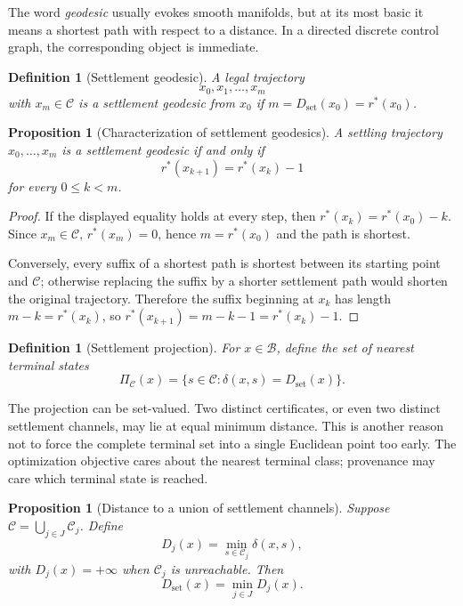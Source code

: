 \documentclass[11pt,letterpaper]{article}
\newtheorem{proposition}[theorem]{Proposition}
\newtheorem{definition}[theorem]{Definition}
\theoremstyle{remark}
\newcommand{\Cset}{\mathcal C}
\newcommand{\Basin}{\mathcal B}
\newcommand{\rstar}{r^{\!*}}
\newcommand{\dset}{D_{\mathrm{set}}}
\begin{document}
The word \emph{geodesic} usually evokes smooth manifolds, but at its most basic it means a shortest path with respect to a distance. In a directed discrete control graph, the corresponding object is immediate.

\begin{definition}[Settlement geodesic]
A legal trajectory
\[
x_0,x_1,\ldots,x_m
\]
with $x_m\in\Cset$ is a settlement geodesic from $x_0$ if $m=\dset(x_0)=\rstar(x_0)$.
\end{definition}

\begin{proposition}[Characterization of settlement geodesics]\label{prop:geodesic}
A settling trajectory $x_0,\ldots,x_m$ is a settlement geodesic if and only if
\[
\rstar(x_{k+1})=\rstar(x_k)-1
\]
for every $0\le k<m$.
\end{proposition}

\begin{proof}
If the displayed equality holds at every step, then $\rstar(x_k)=\rstar(x_0)-k$. Since $x_m\in\Cset$, $\rstar(x_m)=0$, hence $m=\rstar(x_0)$ and the path is shortest.

Conversely, every suffix of a shortest path is shortest between its starting point and $\Cset$; otherwise replacing the suffix by a shorter settlement path would shorten the original trajectory. Therefore the suffix beginning at $x_k$ has length $m-k=\rstar(x_k)$, so $\rstar(x_{k+1})=m-k-1=\rstar(x_k)-1$.
\end{proof}

\begin{definition}[Settlement projection]
For $x\in\Basin$, define the set of nearest terminal states
\[
\Pi_{\Cset}(x)=\{s\in\Cset:\delta(x,s)=\dset(x)\}.
\]
\end{definition}

The projection can be set-valued. Two distinct certificates, or even two distinct settlement channels, may lie at equal minimum distance. This is another reason not to force the complete terminal set into a single Euclidean point too early. The optimization objective cares about the nearest terminal class; provenance may care which terminal state is reached.

\begin{proposition}[Distance to a union of settlement channels]\label{prop:union}
Suppose $\Cset=\bigcup_{j\in J}\Cset_j$. Define
\[
D_j(x)=\min_{s\in\Cset_j}\delta(x,s),
\]
with $D_j(x)=+\infty$ when $\Cset_j$ is unreachable. Then
\[
\dset(x)=\min_{j\in J}D_j(x).
\]
\end{proposition}
\end{document}
